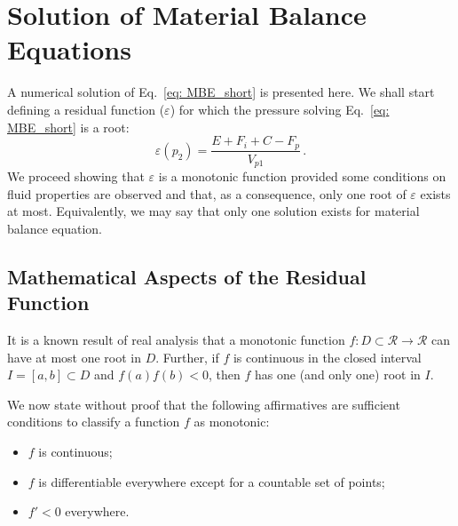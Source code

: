 \documentclass[authoryear,preprint,review,12pt]{elsarticle}
\begin{document}
\section{Solution of Material Balance Equations}
A numerical solution of Eq.~\eqref{eq: MBE_short} is presented here. We shall start defining a residual function ($\varepsilon$) for which the pressure solving Eq.~\eqref{eq: MBE_short} is a root:
\begin{equation}\label{eq: residual}
\varepsilon(p_2) = \frac{E+F_i+C-F_p}{V_{p1}} \, .
\end{equation}
We proceed showing that $\varepsilon$ is a monotonic function provided some conditions on fluid properties are observed and that, as a consequence, only one root of $\varepsilon$ exists at most. Equivalently, we may say that only one solution exists for material balance equation.


\subsection{Mathematical Aspects of the Residual Function}

It is a known result of real analysis that a monotonic function $f:D\subset\mathcal{R}\rightarrow\mathcal{R}$ can have at most one root in $D$. Further, if $f$ is continuous in the closed interval $I=[a,b] \subset D$ and $f(a)f(b)<0$, then $f$ has one (and only one) root in $I$.

We now state without proof that the following affirmatives are sufficient conditions to classify a function $f$ as monotonic:
\begin{itemize}
\item $f$ is continuous;
\item $f$ is differentiable everywhere except for a countable set of points;
\item $f'<0$ everywhere.
\end{itemize}
\end{document}
